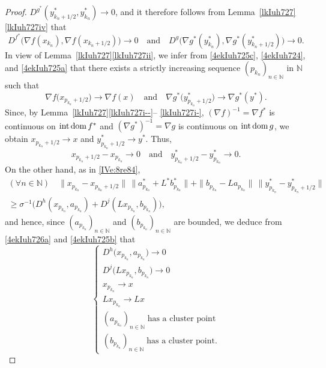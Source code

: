 \documentclass[a4paper,11pt,fleqn]{article}
\renewcommand{\geq}{\ensuremath{\geqslant}}
\newcommand{\NN}{\ensuremath{\mathbb N}}
\newcommand{\intdom}{\ensuremath{\text{\rm int\,dom}\,}}
\theoremstyle{plain}{\theorembodyfont{\rmfamily}%
\newtheorem{conjecture}[theorem]{Conjecture}}
\theoremstyle{plain}{\theorembodyfont{\rmfamily}%
\newtheorem{example}[theorem]{Example}}
\theoremstyle{plain}{\theorembodyfont{\rmfamily}%
\newtheorem{remark}[theorem]{Remark}}
\theoremstyle{plain}{\theorembodyfont{\rmfamily}%
\newtheorem{algorithm}[theorem]{Algorithm}}
\theoremstyle{plain}{\theorembodyfont{\rmfamily}%
\newtheorem{condition}[theorem]{Condition}}
\theoremstyle{plain}{\theorembodyfont{\rmfamily}%
\newtheorem{definition}[theorem]{Definition}}
\theoremstyle{plain}{\theorembodyfont{\rmfamily}
\newtheorem{problem}[theorem]{Problem}}
\theoremstyle{plain}{\theorembodyfont{\rmfamily}
\newtheorem{notation}[theorem]{Notation}}
\numberwithin{equation}{section}
\begin{document}
\begin{proof}
$D^{g^*}(y_{k_n+1/2}^*,y_{k_n}^*)\to 0$, and it therefore follows 
from Lemma~\ref{lkIuh727}\ref{lkIuh727iv} that
\begin{equation}
\label{4ekIuh725a}
D^{f^*}\big(\nabla f(x_{k_n}),\nabla f(x_{k_n+1/2})\big)\to 0
\quad\text{and}\quad 
D^g\big(\nabla g^*(y_{k_n}^*),\nabla g^*(y_{k_n+1/2}^*)\big)\to 0.
\end{equation} 
In view of Lemma~\ref{lkIuh727}\ref{lkIuh727ii}, we infer 
from \eqref{4ekIuh725c}, \eqref{4ekIuh724}, and 
\eqref{4ekIuh725a} that there exists a strictly increasing 
sequence $(p_{k_n})_{n\in\NN}$ in $\NN$ such that
\begin{equation}
\nabla f\big(x_{p_{k_n}+1/2}\big)\to\nabla f(x)
\quad\text{and}\quad 
\nabla g^*\big(y_{p_{k_n}+1/2}^*\big)\to\nabla g^*(y^*).
\end{equation}
Since, by Lemma~\ref{lkIuh727}\ref{lkIuh727i--}--%
\ref{lkIuh727i-},
$(\nabla f)^{-1}=\nabla f^*$ is continuous on
$\intdom f^*$ and $(\nabla g^*)^{-1}=\nabla g$ is continuous on
$\intdom g$, we obtain $x_{p_{k_n}+1/2}\to x$ and 
$y_{p_{k_n}+1/2}^*\to y^*$. Thus, 
\begin{equation}
\label{4ekIuh725b}
x_{p_{k_n}+1/2}-x_{p_{k_n}}\to 0
\quad\text{and}\quad 
y_{p_{k_n}+1/2}^*-y_{p_{k_n}}^*\to 0.
\end{equation}
On the other hand, as in \eqref{IVe:8re84},
\begin{multline}
(\forall n\in\NN)\quad
\|x_{p_{k_n}}-x_{p_{k_n}+1/2}\|\,
\|a_{p_{k_n}}^*+L^*b_{p_{k_n}}^*\|
+\|b_{p_{k_n}}-La_{p_{k_n}}\|\,
\|y_{p_{k_n}}^*-y_{p_{k_n}+1/2}^*\|\\
\geq\sigma^{-1}\big(D^h(x_{p_{k_n}},a_{p_{k_n}})
+D^j(Lx_{p_{k_n}},b_{p_{k_n}})\big),
\end{multline}
and hence, since $(a_{p_{k_n}})_{n\in\NN}$ and 
$(b_{p_{k_n}})_{n\in\NN}$ are bounded, 
we deduce from \eqref{4ekIuh726a} and 
\eqref{4ekIuh725b} that
\begin{equation}
\label{4eKKnhf74g2022a}
\begin{cases}
D^h\big(x_{p_{k_n}},a_{p_{k_n}}\big)\to 0\\
D^j\big(Lx_{p_{k_n}},b_{p_{k_n}}\big)\to 0\\
x_{p_{k_n}}\to x\\
Lx_{p_{k_n}}\to Lx\\
(a_{p_{k_n}})_{n\in\NN}\;\text{has a cluster point}\\
(b_{p_{k_n}})_{n\in\NN}\;\text{has a cluster point}.
\end{cases}
\end{equation}

\end{proof}
\end{document}
